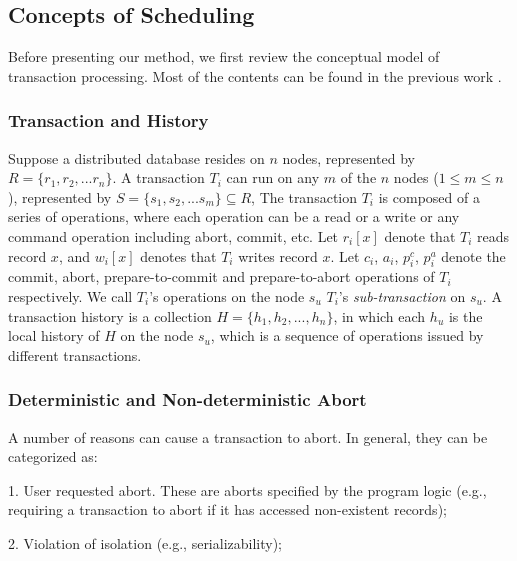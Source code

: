 \documentclass[conference]{IEEEtran}
\begin{document}
\subsection{Concepts of Scheduling}
Before presenting our method, we first review the conceptual model of transaction processing. Most of the contents can be found in the previous work \cite{LockNoWait:journals/csur/BernsteinG81}.

\subsubsection{Transaction and History}
Suppose a distributed database resides on ${n}$ nodes, represented by ${R = \{r_1, r_2, ... r_n\}}$.
A transaction ${T_i}$ can run on any ${m}$ of the ${n}$ nodes ($1 \le m \le n$), represented by  ${S = \{s_1, s_2, ... s_m\} \subseteq R}$, 
The transaction ${T_i}$ is composed of a series of operations, %
where each operation can be a read or a write or any command operation including abort, commit, etc.
Let ${r_i[x]}$ denote that ${T_i}$ reads record ${x}$,  and ${w_i[x]}$ denotes that ${T_i}$ writes record ${x}$.
Let ${c_i}$, ${a_i}$, ${p^c_i}$, ${p^a_i}$ denote the commit, abort, prepare-to-commit and prepare-to-abort operations of ${T_i}$ respectively.
We call ${T_i}$'s operations on the node ${s_u}$ ${T_i}$'s \emph{sub-transaction} on ${s_u}$.
A transaction history is a collection ${H = \{h_1, h_2, ..., h_n\}}$, in which
each ${h_u}$ is the local history of $H$ on the node ${s_u}$, which is a sequence of operations issued by different transactions.


\subsubsection{Deterministic and Non-deterministic Abort}
A number of reasons can cause a transaction to abort. In general, they can be categorized as:

1. User requested abort. These are aborts specified by the program logic (e.g., requiring a transaction to abort if it has accessed non-existent records);

2. Violation of isolation (e.g., serializability);
\end{document}
